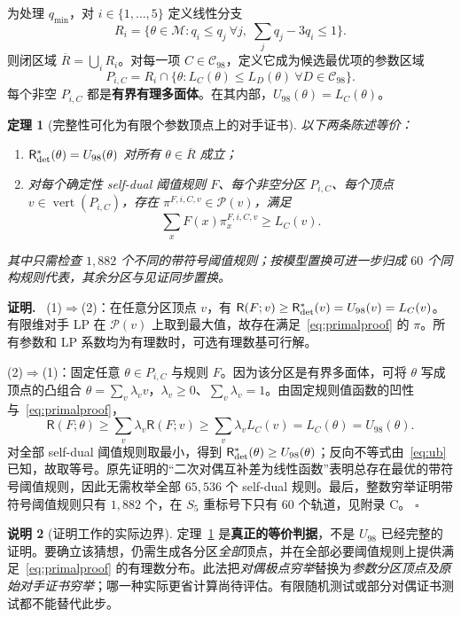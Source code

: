 \documentclass[11pt,a4paper]{ctexart}
\newtheorem{theorem}{定理}[section]
\theoremstyle{definition}
\newtheorem{remark}[theorem]{说明}
\newenvironment{proofcn}{\par\noindent\textbf{证明.}\ }{\hfill$\square$\par}
\newcommand{\Risk}{\mathsf R}
\newcommand{\calP}{\mathcal P}
\newcommand{\calC}{\mathcal C}
\begin{document}
为处理 $q_{\min}$，对 $i\in\{1,\dots,5\}$ 定义线性分支
\[
R_i=\{\theta\in\mathcal M:q_i\le q_j\ \forall j,\;\sum_jq_j-3q_i\le1\}.
\]
则闭区域 $\overline R=\bigcup_iR_i$。对每一项 $C\in\calC_{98}$，定义它成为候选最优项的参数区域
\begin{equation}\label{eq:cell}
P_{i,C}=R_i\cap\{\theta:L_C(\theta)\le L_D(\theta)\ \forall D\in\calC_{98}\}.
\end{equation}
每个非空 $P_{i,C}$ 都是\textbf{有界有理多面体}。在其内部，$U_{98}(\theta)=L_C(\theta)$。

\begin{theorem}[完整性可化为有限个参数顶点上的对手证书]\label{thm:vertex}
以下两条陈述等价：
\begin{enumerate}
\item $\Risk^*_{\rm det}(\theta)=U_{98}(\theta)$ 对所有 $\theta\in\overline R$ 成立；
\item 对每个确定性 self-dual 阈值规则 $F$、每个非空分区 $P_{i,C}$、每个顶点 $v\in\operatorname{vert}(P_{i,C})$，存在 $\pi^{F,i,C,v}\in\calP(v)$，满足
\begin{equation}\label{eq:primalproof}
\sum_x F(x)\pi_x^{F,i,C,v}\ge L_C(v).
\end{equation}
\end{enumerate}
其中只需检查 $1{,}882$ 个不同的带符号阈值规则；按模型置换可进一步归成 $60$ 个同构规则代表，其余分区与见证同步置换。
\end{theorem}
\begin{proofcn}
(1)$\Rightarrow$(2)：在任意分区顶点 $v$，有 $\Risk(F;v)\ge \Risk^*_{\rm det}(v)=U_{98}(v)=L_C(v)$。有限维对手 LP 在 $\calP(v)$ 上取到最大值，故存在满足~\eqref{eq:primalproof} 的 $\pi$。所有参数和 LP 系数均为有理数时，可选有理数基可行解。

(2)$\Rightarrow$(1)：固定任意 $\theta\in P_{i,C}$ 与规则 $F$。因为该分区是有界多面体，可将 $\theta$ 写成顶点的凸组合 $\theta=\sum_v\lambda_vv$，$\lambda_v\ge0$、$\sum_v\lambda_v=1$。由固定规则值函数的凹性与~\eqref{eq:primalproof}，
\[
\Risk(F;\theta)\ge\sum_v\lambda_v\Risk(F;v)
\ge\sum_v\lambda_vL_C(v)=L_C(\theta)=U_{98}(\theta).
\]
对全部 self-dual 阈值规则取最小，得到 $\Risk_{\rm det}^*(\theta)\ge U_{98}(\theta)$；反向不等式由~\eqref{eq:ub} 已知，故取等号。原先证明的“二次对偶互补差为线性函数”表明总存在最优的带符号阈值规则，因此无需枚举全部 $65{,}536$ 个 self-dual 规则。最后，整数穷举证明带符号阈值规则只有 $1{,}882$ 个，在 $S_5$ 重标号下只有 $60$ 个轨道，见附录 C。
\end{proofcn}

\begin{remark}[证明工作的实际边界]
定理~\ref{thm:vertex} 是\textbf{真正的等价判据}，不是 $U_{98}$ 已经完整的证明。要确立该猜想，仍需生成各分区\emph{全部}顶点，并在全部必要阈值规则上提供满足~\eqref{eq:primalproof} 的有理数分布。此法把\emph{对偶极点穷举}替换为\emph{参数分区顶点及原始对手证书穷举}；哪一种实际更省计算尚待评估。有限随机测试或部分对偶证书测试都不能替代此步。
\end{remark}
\end{document}
